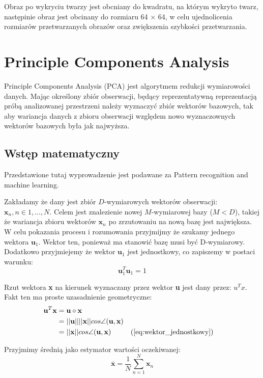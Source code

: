 \documentclass[oneside, eng]{mgr}
\newcommand{\bb}{\textbf}
\begin{document}
Obraz po wykryciu twarzy jest obcniany do kwadratu, na którym wykryto twarz, następinie obraz jest obcinany do rozmiaru 64 $\times$ 64, w celu ujednolicenia rozmiarów przetwarzanych obrazów oraz zwiększenia szybkości przetwarzania.
 
\section{Principle Components Analysis}

Principle Components Analysis (PCA) jest algorytmem redukcji wymiarowości danych. Mając określony zbiór obserwacji, będący reprezentatywną reprezentacją próbą analizowanej przestrzeni należy wyznaczyć zbiór wektorów bazowych, tak aby wariancja danych z zbioru obserwacji względem nowo wyznaczownych wektorów bazowych była jak najwyższa.

\subsection{Wstęp matematyczny}

Przedstawione tutaj wyprowadzenie jest podawane za Pattern recognition and machine learning.

Zakładamy że dany jest zbiór $D$-wymiarowych wektorów obserwacji: $\bb{x}_n , n \in 1,...,N $. Celem jest znalezienie nowej $M$-wymiarowej bazy ($M < D$), takiej że wariancja zbioru wektorów $\bb{x}_n$ po zrzutowaniu na nową bazę jest największa. W celu pokazania procesu i rozumowania przyjmijmy że szukamy jednego wektora $\bb{u}_1$. Wektor ten, ponieważ ma stanowić bazę musi być D-wymiarowy. Dodatkowo przyjmiejemy że wektor $\bb{u}_1$ jest jednostkowy, co zapiszemy w postaci warunku:
\begin{equation} \label{eq:wektor_jednostkowy}
	\bb{u}_1^{T}\bb{u}_1 = 1
\end{equation}

Rzut wektora \bb{x} na kierunek wyznaczany przez wektor \bb{u} jest dany przez: $u^{T}x$. Fakt ten ma proste uzasadnienie geometryczne:
\begin{align*}	
	\bb{u}^{T} \bb{x} &= \bb{u} \circ \bb{x} \\
		   & = ||\bb{u}|| ||\bb{x}|| cos \angle (\bb{u}, \bb{x}) \index{1} \\
		   &= ||\bb{x}|| cos \angle (\bb{u}, \bb{x}) \index{1} && \text{(\ref{eq:wektor_jednostkowy})}
\end{align*}

Przyjmimy średnią jako estymator wartości oczekiwanej:
\begin{equation}	\overline{\bb{x}} = \frac{1}{N} \sum_{n=1}^{N} \bb{x}_n \end{equation}
\end{document}
